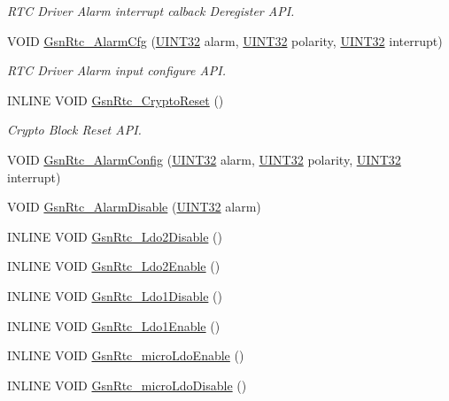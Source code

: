 \begin{DoxyCompactItemize}
\begin{DoxyCompactList}\small\item\em RTC Driver Alarm interrupt calback Deregister API. \end{DoxyCompactList}\item 
VOID \hyperlink{a00651_ga6fc5ea8da5e29c2fa1363b0a3a6c6e4a}{GsnRtc\_\-AlarmCfg} (\hyperlink{a00660_gae1e6edbbc26d6fbc71a90190d0266018}{UINT32} alarm, \hyperlink{a00660_gae1e6edbbc26d6fbc71a90190d0266018}{UINT32} polarity, \hyperlink{a00660_gae1e6edbbc26d6fbc71a90190d0266018}{UINT32} interrupt)
\begin{DoxyCompactList}\small\item\em RTC Driver Alarm input configure API. \end{DoxyCompactList}\item 
INLINE VOID \hyperlink{a00651_gabd93fb337eb2179a3a9d5073c869037e}{GsnRtc\_\-CryptoReset} ()
\begin{DoxyCompactList}\small\item\em Crypto Block Reset API. \end{DoxyCompactList}\item 
VOID \hyperlink{a00582_a239c16937c0e8067c3b3efb32c79527e}{GsnRtc\_\-AlarmConfig} (\hyperlink{a00660_gae1e6edbbc26d6fbc71a90190d0266018}{UINT32} alarm, \hyperlink{a00660_gae1e6edbbc26d6fbc71a90190d0266018}{UINT32} polarity, \hyperlink{a00660_gae1e6edbbc26d6fbc71a90190d0266018}{UINT32} interrupt)
\item 
VOID \hyperlink{a00582_a3507bc0ef01856100aa56f82c621bae4}{GsnRtc\_\-AlarmDisable} (\hyperlink{a00660_gae1e6edbbc26d6fbc71a90190d0266018}{UINT32} alarm)
\item 
INLINE VOID \hyperlink{a00582_a6a27d7a4a2d435d42d2a5f1635e1ab32}{GsnRtc\_\-Ldo2Disable} ()
\item 
INLINE VOID \hyperlink{a00582_a1dcbcbb53e0459901823e6b6ef70f37b}{GsnRtc\_\-Ldo2Enable} ()
\item 
INLINE VOID \hyperlink{a00582_abdee32f92cfdcac7eedf89839ca52331}{GsnRtc\_\-Ldo1Disable} ()
\item 
INLINE VOID \hyperlink{a00582_adea699fc677cf84b30c90574593d6fc1}{GsnRtc\_\-Ldo1Enable} ()
\item 
INLINE VOID \hyperlink{a00582_a144d7e5609f1965cf48e91987066478c}{GsnRtc\_\-microLdoEnable} ()
\item 
INLINE VOID \hyperlink{a00582_a946a7caa07d180fa1f41c36db7187e17}{GsnRtc\_\-microLdoDisable} ()
\end{DoxyCompactItemize}


